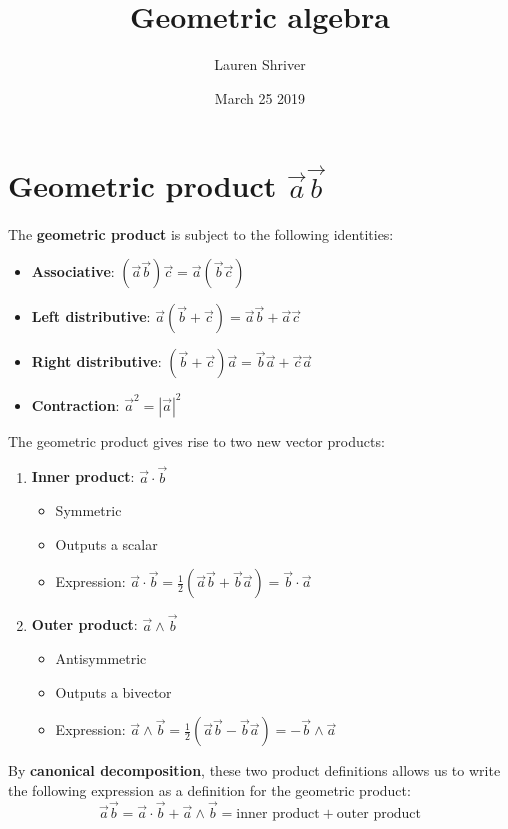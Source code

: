 \documentclass[a4paper]{article}
\title{Geometric algebra}
\author{Lauren Shriver}
\date{March 25 2019}
\begin{document}
\maketitle

\section*{Geometric product $\vec{a}\vec{b}$}
    The \textbf{geometric product} is subject to the following identities:
    \begin{itemize}
        \item \textbf{Associative}: $(\vec{a}\vec{b})\vec{c}=\vec{a}(\vec{b}\vec{c})$
        \item \textbf{Left distributive}: $\vec{a}(\vec{b}+\vec{c})=\vec{a}\vec{b}+\vec{a}\vec{c}$
        \item \textbf{Right distributive}: $(\vec{b}+\vec{c})\vec{a}=\vec{b}\vec{a}+\vec{c}\vec{a}$
        \item \textbf{Contraction}: $\vec{a}^2=|\vec{a}|^2$
    \end{itemize}
    The geometric product gives rise to two new vector products:
    \begin{enumerate}
        \item \textbf{Inner product}: $\vec{a}\cdot \vec{b}$
            \begin{itemize}
                \item Symmetric
                \item Outputs a scalar
                \item Expression: $\vec{a}\cdot \vec{b} = \frac{1}{2}(\vec{a}\vec{b} + \vec{b}\vec{a}) = \vec{b}\cdot \vec{a}$
            \end{itemize}
        \item \textbf{Outer product}: $\vec{a} \wedge \vec{b}$
            \begin{itemize}
                \item Antisymmetric
                \item Outputs a bivector
                \item Expression: $\vec{a}\wedge \vec{b} = \frac{1}{2}(\vec{a}\vec{b}-\vec{b}\vec{a}) = -\vec{b}\wedge \vec{a}$
            \end{itemize}
    \end{enumerate}
    By \textbf{canonical decomposition}, these two product definitions allows us to write the following expression as a definition for the geometric product:
    \begin{equation*}
        \vec{a}\vec{b} = \vec{a}\cdot\vec{b} + \vec{a}\wedge\vec{b} = \text{inner product} + \text{outer product}
    \end{equation*}
\end{document}
